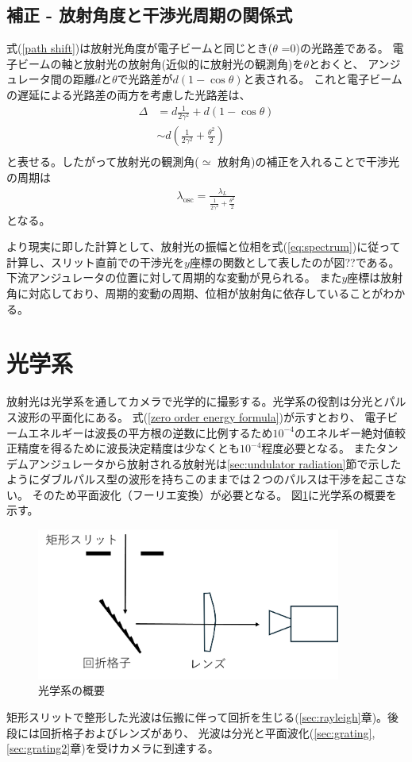 \documentclass[a4paper,11pt,uplatex]{jsbook}
\begin{document}
\subsection{補正 - 放射角度と干渉光周期の関係式}
式(\ref*{path shift})は放射光角度が電子ビームと同じとき($\theta$ =0)の光路差である。
電子ビームの軸と放射光の放射角(近似的に放射光の観測角)を$\theta$とおくと、
アンジュレータ間の距離$d$と$\theta$で光路差が$d(1-\cos{\theta})$と表される。
これと電子ビームの遅延による光路差の両方を考慮した光路差は、
\begin{eqnarray}
  \Delta &= d\frac{1}{2\gamma^2} + d(1 - \cos{\theta}) \\
        &\sim d(\frac{1}{2\gamma^2} + \frac{\theta^2}{2})\\
\end{eqnarray}
と表せる。したがって放射光の観測角($\simeq$ 放射角)の補正を入れることで干渉光の周期は
\begin{eqnarray}
  \lambda_{\text{osc}} = \frac{\lambda_L}{\frac{1}{2\gamma^2} + \frac{\theta^2}{2}}
\end{eqnarray}
となる。

より現実に即した計算として、放射光の振幅と位相を式(\ref{eq:spectrum})に従って計算し、スリット直前での干渉光を$y$座標の関数として表したのが図??である。
下流アンジュレータの位置に対して周期的な変動が見られる。
また$y$座標は放射角に対応しており、周期的変動の周期、位相が放射角に依存していることがわかる。


\section{光学系}\label{sec:optics}
放射光は光学系を通してカメラで光学的に撮影する。光学系の役割は分光とパルス波形の平面化にある。
式(\ref{zero order energy formula})が示すとおり、
電子ビームエネルギーは波長の平方根の逆数に比例するため$10^{-4}$のエネルギー絶対値較正精度を得るために波長決定精度は少なくとも$10^{-4}$程度必要となる。
またタンデムアンジュレータから放射される放射光は\ref{sec:undulator radiation}節で示したようにダブルパルス型の波形を持ちこのままでは２つのパルスは干渉を起こさない。
そのため平面波化（フーリエ変換）が必要となる。
図\ref{optics_schematic}に光学系の概要を示す。
\begin{figure}[h]
  \centering
  \includegraphics[width=10cm]{image/2-opticsshematic.png}
  \caption{光学系の概要}
  \label{optics_schematic}
\end{figure}
矩形スリットで整形した光波は伝搬に伴って回折を生じる(\ref{sec:rayleigh}章)。後段には回折格子およびレンズがあり、
光波は分光と平面波化(\ref{sec:grating},\ref{sec:grating2}章)を受けカメラに到達する。
\end{document}
